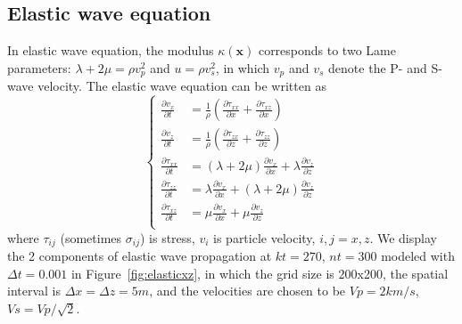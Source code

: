% 
% 
% 




\subsection{Elastic wave equation}

In elastic wave equation, the modulus $\kappa(\textbf{x})$ corresponds to two Lame parameters: $\lambda+2\mu=\rho v_p^2$ and $u=\rho v_s^2$, in which $v_p$ and $v_s$ denote the P- and S-wave velocity. The elastic wave equation can be written as
\begin{equation}\label{eq:elastic}
\left\{
\begin{split}
	\frac{\partial v_x}{\partial t} &=\frac{1}{\rho} (\frac{\partial \tau_{xx}}{\partial x}+\frac{\partial \tau_{xz}}{\partial x})\\
	\frac{\partial v_z}{\partial t} &=\frac{1}{\rho} (\frac{\partial \tau_{zx}}{\partial z}+\frac{\partial \tau_{zz}}{\partial z})\\	
	\frac{\partial\tau_{xx}}{\partial t} &=(\lambda+2\mu)\frac{\partial v_x}{\partial x}+\lambda\frac{\partial v_z}{\partial z}\\
	\frac{\partial\tau_{zz}}{\partial t} &=\lambda\frac{\partial v_x}{\partial x}+(\lambda+2\mu)\frac{\partial v_z}{\partial z}\\
	\frac{\partial\tau_{xz}}{\partial t} &=\mu \frac{\partial v_x}{\partial x}+\mu\frac{\partial v_z}{\partial z}\\
\end{split}\right.
\end{equation}
where $\tau_{ij}$ (sometimes $\sigma_{ij}$) is stress, $v_i$ is particle velocity, $i,j=x,z$. We display the 2 components of elastic wave propagation at $kt=270$, $nt=300$ modeled with $\Delta t=0.001$ in Figure~\ref{fig:elasticxz}, in which the grid size is 200x200, the spatial interval is $\Delta x=\Delta z=5m$, and the velocities are chosen to be $Vp=2km/s$, $Vs=Vp/\sqrt{2}$.

